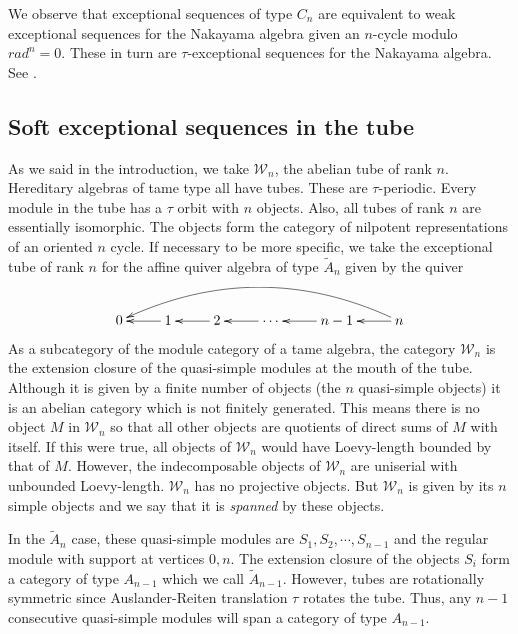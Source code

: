 \documentclass[11pt]{amsart}
\theoremstyle{definition}
\theoremstyle{remark}
\numberwithin{equation}{section}
\newcommand{\cW}{\ensuremath{{\mathcal{W}}}}
\begin{document}
We observe that exceptional sequences of type $C_n$ are equivalent to weak exceptional sequences for the Nakayama algebra given an $n$-cycle modulo $rad^n=0$. These in turn are $\tau$-exceptional sequences \cite{BM} for the Nakayama algebra. See \cite{Sen2}.

\subsection{Soft exceptional sequences in the tube}\label{ss: soft exc seq in tubes}

As we said in the introduction, we take $\cW_n$, the abelian tube of rank $n$. Hereditary algebras of tame type all have tubes. These are $\tau$-periodic. Every module in the tube has a $\tau$ orbit with $n$ objects. Also, all tubes of rank $n$ are essentially isomorphic. The objects form the category of nilpotent representations of an oriented $n$ cycle. If necessary to be more specific, we take the exceptional tube of rank $n$ for the affine quiver algebra of type $\tilde A_n$ given by the quiver
\[
\xymatrixrowsep{10pt}%
\xymatrix{%
\ \\
0  & 1\ar[l] & 2\ar[l] & \cdots\ar[l] & n-1\ar[l]&
	n \ar[l] \ar@/_2pc/[lllll]} %
\]
As a subcategory of the module category of a tame algebra, the category $\cW_n$ is the extension closure of the quasi-simple modules at the mouth of the tube. Although it is given by a finite number of objects (the $n$ quasi-simple objects) it is an abelian category which is not finitely generated. This means there is no object $M$ in $\cW_n$ so that all other objects are quotients of direct sums of $M$ with itself. If this were true, all objects of $\cW_n$ would have Loevy-length bounded by that of $M$. However, the indecomposable objects of $\cW_n$ are uniserial with unbounded Loevy-length. $\cW_n$ has no projective objects. But $\cW_n$ is given by its $n$ simple objects and we say that it is \emph{spanned} by these objects.



In the $\tilde A_n$ case, these quasi-simple modules are $S_1,S_2,\cdots,S_{n-1}$ and the regular module with support at vertices $0,n$. The extension closure of the objects $S_i$ form a category of type $A_{n-1}$ which we call $\widetilde A_{n-1}$. However, tubes are rotationally symmetric since Auslander-Reiten translation $\tau$ rotates the tube. Thus, any $n-1$ consecutive quasi-simple modules will {span} a category of type $A_{n-1}$. 
\end{document}
